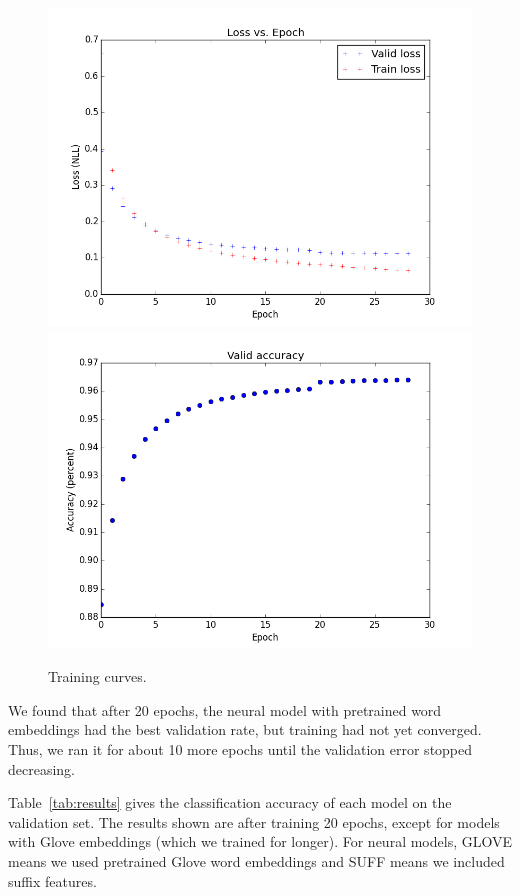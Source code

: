 \documentclass[11pt]{article}
\begin{document}
\begin{figure}
	\centering
	\includegraphics[scale=0.4]{loss_plots}
	\includegraphics[scale=0.4]{acc_plot}
	\caption{\label{fig:loss} Training curves.}
\end{figure}

We found that after 20 epochs, the neural model with pretrained word embeddings had the best validation rate, but training had not yet converged. Thus, we ran it for about 10 more epochs until the validation error stopped decreasing.

Table~\ref{tab:results} gives the classification accuracy of each model on the validation set. The results shown are after training 20 epochs, except for models with Glove embeddings (which we trained for longer). For neural models, GLOVE means we used pretrained Glove word embeddings and SUFF means we included suffix features.
\end{document}
